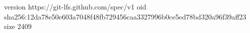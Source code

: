 version https://git-lfs.github.com/spec/v1
oid sha256:12da78e50e603a7048f48fb729456caa3327996b0ce5ed78bd320a96f39aff23
size 2409
